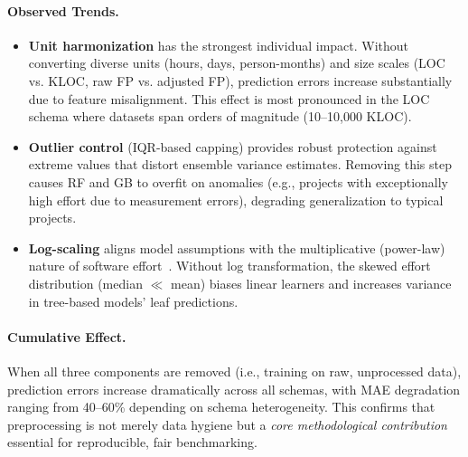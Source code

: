 \documentclass{ieeeaccess}
\begin{document}
\paragraph{Observed Trends.}
\begin{itemize}[leftmargin=1.5em]
    \item \textbf{Unit harmonization} has the strongest individual impact. 
    Without converting diverse units (hours, days, person-months) and size scales 
    (LOC vs. KLOC, raw FP vs. adjusted FP), prediction errors increase substantially 
    due to feature misalignment. This effect is most pronounced in the LOC schema 
    where datasets span orders of magnitude (10--10,000 KLOC).
    
    \item \textbf{Outlier control} (IQR-based capping) provides robust protection 
    against extreme values that distort ensemble variance estimates. 
    Removing this step causes RF and GB to overfit on anomalies 
    (e.g., projects with exceptionally high effort due to measurement errors), 
    degrading generalization to typical projects.
    
    \item \textbf{Log-scaling} aligns model assumptions with the multiplicative 
    (power-law) nature of software effort~\cite{boehm2000software}. 
    Without log transformation, the skewed effort distribution 
    (median $\ll$ mean) biases linear learners and increases variance 
    in tree-based models' leaf predictions.
\end{itemize}

\paragraph{Cumulative Effect.}
When all three components are removed (i.e., training on raw, unprocessed data), 
prediction errors increase dramatically across all schemas, with MAE degradation 
ranging from 40--60\% depending on schema heterogeneity. 
This confirms that preprocessing is not merely data hygiene but a \textit{core methodological contribution} 
essential for reproducible, fair benchmarking.
\end{document}

